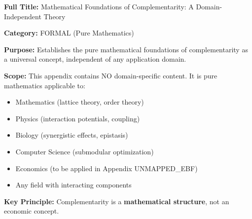 \begin{tcolorbox}[colback=blue!5!white,colframe=blue!75!black,title=\textbf{Appendix UNMAPPED_FND: FORMAL-FOUND}]
\textbf{Full Title:} Mathematical Foundations of Complementarity: A Domain-Independent Theory

\textbf{Category:} FORMAL (Pure Mathematics)

\textbf{Purpose:} Establishes the pure mathematical foundations of complementarity as a universal concept, independent of any application domain.

\textbf{Scope:} This appendix contains NO domain-specific content. It is pure mathematics applicable to:
\begin{itemize}[noitemsep]
    \item Mathematics (lattice theory, order theory)
    \item Physics (interaction potentials, coupling)
    \item Biology (synergistic effects, epistasis)
    \item Computer Science (submodular optimization)
    \item Economics (to be applied in Appendix UNMAPPED_EBF)
    \item Any field with interacting components
\end{itemize}

\textbf{Key Principle:} Complementarity is a \textbf{mathematical structure}, not an economic concept.
\end{tcolorbox}

